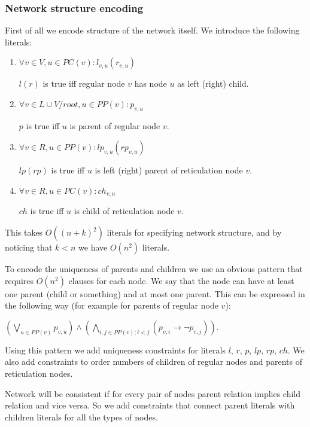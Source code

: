 \documentclass[runningheads, envcountsame, a4paper]{llncs}
\begin{document}
\subsubsection{Network structure encoding} 

First of all we encode structure of the network itself. We introduce the following literals: 

\begin{enumerate}

\item $\forall v \in V, u \in PC(v) : l_{v,u}(r_{v,u})$ 

$l (r)$ is true iff regular node $v$ has node $u$ as left (right) child.

\item $\forall v \in L \cup V / root, u \in PP(v) : p_{v,u}$ 

$p$ is true iff $u$ is parent of regular node $v$.

\item $\forall v \in R, u \in PP(v) : lp_{v,u}(rp_{v,u})$ 

$lp (rp)$ is true iff $u$ is left (right) parent of reticulation node $v$.

\item $\forall v \in R, u \in PC(v) : ch_{v,u}$ 

$ch$ is true iff $u$ is child of reticulation node $v$.

\end{enumerate}

This takes $O((n + k)^2)$ literals for specifying network structure, and by noticing that $k < n$ we have $O(n^2)$ literals.

To encode the uniqueness of parents and children we use an obvious pattern that requires $O(n^2)$ clauses for each node. We say 
that the node can have at least one parent (child or something) and at most one parent. This can be expressed 
in the following way (for example for parents of regular node $v$): 

$(\bigvee\limits_{u \in PP(v)} p_{v,u}) \wedge (\bigwedge\limits_{i, j \in PP(v);i < j} (p_{v,i} \rightarrow \neg p_{v,j}))$.

Using this pattern we add uniqueness constraints for literals $l$, $r$, $p$, $lp$, $rp$, $ch$. We also add constraints to order numbers of children of regular nodes and parents of reticulation nodes.

Network will be consistent if for every pair of nodes parent relation implies child relation and vice versa. So we add constraints that connect parent literals with children literals for all the types of nodes.
\end{document}
